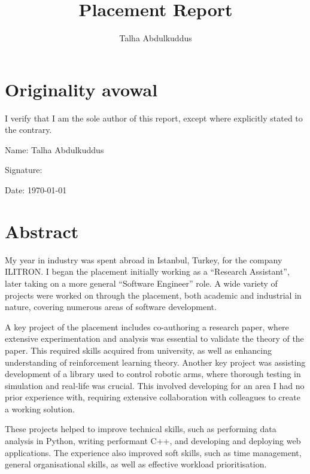 \documentclass[british,12pt,a4paper]{report}
\begin{document}
\title{Placement Report}
\author{Talha Abdulkuddus}


\setcounter{page}{2} %

\vfill

\section*{Originality avowal}

I verify that I am the sole author of this report, except where explicitly stated to the contrary.

\bigskip

Name: Talha Abdulkuddus

\medskip

Signature:


\medskip

Date: \today

\vfill

\section*{Abstract}

My year in industry was spent abroad in Istanbul, Turkey, for the company ILITRON\@. I began the
placement initially working as a \enquote{Research Assistant}, later taking on a more general
\enquote{Software Engineer} role. A wide variety of projects were worked on through the placement,
both academic and industrial in nature, covering numerous areas of software development.

A key project of the placement includes co-authoring a research paper, where extensive
experimentation and analysis was essential to validate the theory of the paper. This required skills
acquired from university, as well as enhancing understanding of reinforcement learning theory.
Another key project was assisting development of a library used to control robotic arms, where
thorough testing in simulation and real-life was crucial. This involved developing for an area I had
no prior experience with, requiring extensive collaboration with colleagues to create a working
solution.

These projects helped to improve technical skills, such as performing data analysis in Python,
writing performant C++, and developing and deploying web applications. The experience also improved
soft skills, such as time management, general organisational skills, as well as effective workload
prioritisation.
\end{document}
